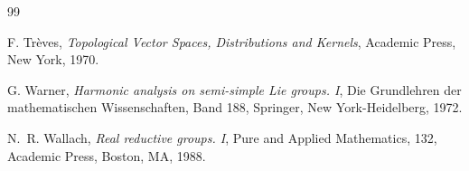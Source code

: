 \documentclass[12pt, a4paper]{amsart}
\theoremstyle{Theorem}
\theoremstyle{Theorem}
\theoremstyle{Theorem}
\theoremstyle{Theorem}
\theoremstyle{Plain}
\theoremstyle{remark}
\theoremstyle{remark}
\theoremstyle{Definition}
\numberwithin{equation}{section}
\begin{document}
\begin{thebibliography}{99}




F. Tr\`eves, \textit{Topological Vector Spaces, Distributions and
Kernels}, Academic Press, New York, 1970.


%
%
G. Warner, \textit{ Harmonic analysis on semi-simple Lie groups. I}, Die Grundlehren der mathematischen Wissenschaften, Band 188, Springer, New York-Heidelberg, 1972.
 
N.~R. Wallach, \textit {Real reductive groups. I}, Pure and Applied Mathematics, 132, Academic Press, Boston, MA, 1988.






\end{thebibliography}
\end{document}
